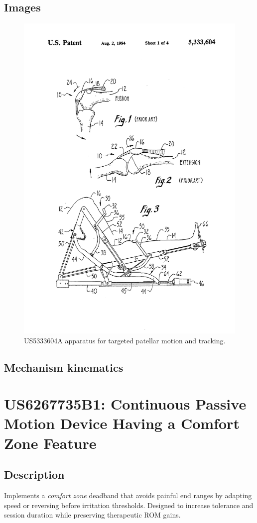 \documentclass[11pt]{article}
\begin{document}
\subsection{Images}
\begin{figure}[H]
  \centering
  \includegraphics[width=0.54\linewidth]{US5333604_1.png}
  \caption{US5333604A apparatus for targeted patellar motion and tracking.}
  \label{fig:US5333604A}
\end{figure}

\subsection{Mechanism kinematics}

\section{US6267735B1: Continuous Passive Motion Device Having a Comfort Zone Feature}
\subsection{Description}
Implements a \emph{comfort zone} deadband that avoids painful end ranges by adapting speed or reversing before irritation thresholds. Designed to increase tolerance and session duration while preserving therapeutic ROM gains.
\end{document}
